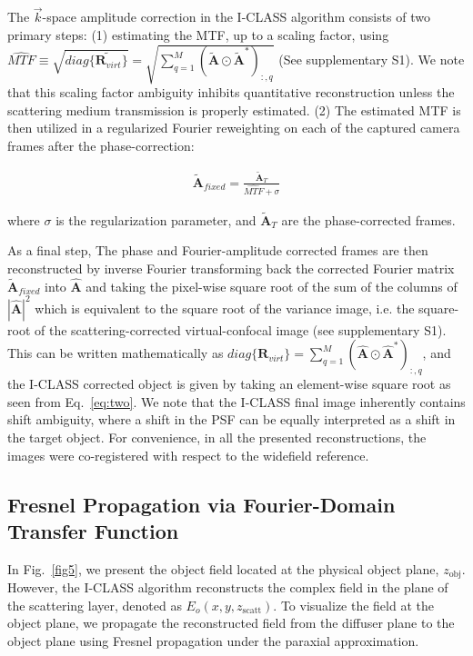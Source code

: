 \documentclass[pdflatex,sn-mathphys-num]{sn-jnl}%
\theoremstyle{thmstyleone}%
\theoremstyle{thmstyletwo}%
\theoremstyle{thmstylethree}%
\begin{document}
The $\vec{k}$-space amplitude correction in the I-CLASS algorithm consists of two primary steps: (1) estimating the MTF, up to a scaling factor, using $\widehat{MTF} \equiv  \sqrt{diag\{ \tilde{\textbf{R}_{virt}} \}} = \sqrt{\sum_{q=1}^{M} (\tilde{\textbf{A}} \odot \tilde{\textbf{A}}^*)_{:,q}}$ (See supplementary S1). We note that this scaling factor ambiguity inhibits quantitative reconstruction unless the scattering medium transmission is properly estimated. (2) The estimated MTF is then utilized in a regularized Fourier reweighting on each of the captured camera frames after the phase-correction:%

\begin{eqnarray}
\tilde{\textbf{A}}_{fixed}=\frac{\tilde{\textbf{A}}_T}{\widehat{MTF}+\sigma}
\end{eqnarray}


\noindent where $\sigma$ is the regularization parameter, and $\tilde{\textbf{A}}_T$ are the phase-corrected frames.  

As a final step, The phase and Fourier-amplitude corrected frames are then reconstructed by inverse Fourier transforming back the corrected Fourier matrix $\tilde{\textbf{A}}_{fixed}$ into $\hat{\textbf{A}}$ and taking the pixel-wise square root of the sum of the columns of $|\hat{\textbf{A}}|^2$ which is equivalent to the square root of the variance image, i.e. the square-root of the scattering-corrected virtual-confocal image (see supplementary S1). This can be written mathematically as $diag\{ \textbf{R}_{virt} \} = \sum_{q=1}^{M} (\hat{\textbf{A}} \odot \hat{\textbf{A}}^*)_{:,q}$, and the I-CLASS corrected object 
is given by taking an element-wise square root as seen from Eq.~\ref{eq:two}. We note that the I-CLASS final image inherently contains shift ambiguity, where a shift in the PSF can be equally interpreted as a shift in the target object. For convenience, in all the presented reconstructions, the images were co-registered with respect to the widefield reference.


\subsection*{Fresnel Propagation via Fourier-Domain Transfer Function}
\label{Fresnel_propagation}
In Fig.~\ref{fig5}, we present the object field located at the physical object plane, $z_{\text{obj}}$. However, the I-CLASS algorithm reconstructs the complex field in the plane of the scattering layer, denoted as $E_o(x, y, z_{\text{scatt}})$. To visualize the field at the object plane, we propagate the reconstructed field from the diffuser plane to the object plane using Fresnel propagation under the paraxial approximation.
\end{document}
